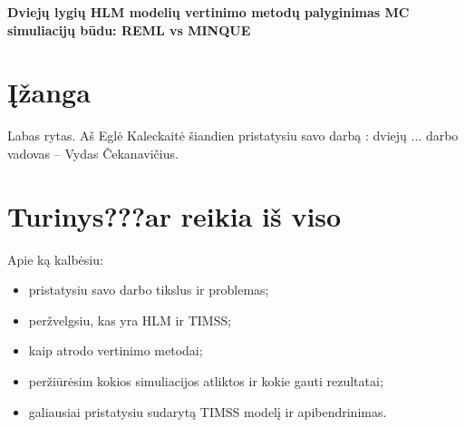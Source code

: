 \documentclass[12pt,a4paper]{article}
\begin{document}
	\begin{center}{\large\textbf{Dviejų lygių HLM modelių vertinimo metodų palyginimas MC simuliacijų būdu: REML vs MINQUE}}\end{center}

\section*{Įžanga}

Labas rytas. Aš Eglė Kaleckaitė šiandien pristatysiu savo darbą : dviejų ... darbo vadovas -- Vydas Čekanavičius.


\section*{Turinys???ar reikia iš viso}
Apie ką kalbėsiu:
\begin{itemize}
\item pristatysiu savo darbo tikslus ir problemas;
\item peržvelgsiu, kas yra HLM ir TIMSS;
\item kaip atrodo vertinimo metodai;
\item peržiūrėsim kokios simuliacijos atliktos ir kokie gauti rezultatai;
\item galiausiai pristatysiu sudarytą TIMSS modelį ir apibendrinimas.
\end{itemize}
\end{document}
